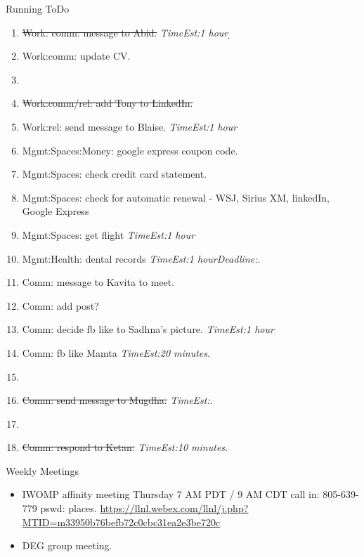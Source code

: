 \documentclass[serif, mathserif, final]{beamer}
\newcommand{\doneTask}[1]{\tiny \item \tiny \sout{#1}}
\newcommand{\te}[1]{\textit{TimeEst:}\textit{#1}}
\newcommand{\dl}[1]{\textit{Deadline:}\textit{#1}}
\begin{document}
\begin{frame}
\begin{columns}
\begin{column}{0.5\linewidth}
  \begin{block}{Running ToDo} %
    \begin{enumerate} 
    \doneTask{Work: comm: message to Abid.} \te{1 hour} \d{} \p{}  
  \item \tiny Work:comm: update CV.
  \item \tiny \doneTask{Work:comm/rel: add Tony to LinkedIn.} 
  \item \tiny Work:rel: send message to Blaise. \te{1 hour} 
\item \tiny Mgmt:Spaces:Money: google express coupon code. 
\item \tiny Mgmt:Spaces: check credit card statement. 
\item \tiny Mgmt:Spaces: check for automatic renewal  - WSJ,  Sirius XM, linkedIn, Google Express 
\item \tiny Mgmt:Spaces: get flight \te{1 hour}
\item \tiny Mgmt:Health: dental records \te{1 hour}\dl{}. 
\item \tiny Comm: message to Kavita to meet. 
\item \tiny Comm: add post? 
\item \tiny Comm: decide fb like to Sadhna's picture. \te{1 hour}  
\item \tiny Comm: fb like Mamta \te{20 minutes}. 
\item \tiny \doneTask{Comm: send message to Mugdha.} \te{}. 
\item \tiny \doneTask{Comm: respond to Ketan.} \te{10 minutes}. 
    \end{enumerate}
  \end{block} 
  

  \begin{block}{Weekly Meetings}
    \begin{itemize} 
    \item \tiny IWOMP affinity meeting Thursday 7 AM PDT / 9 AM
      CDT call in: 805-639-779 pswd: places. 
      \url{https://llnl.webex.com/llnl/j.php?MTID=m33950b76befb72c0cbc31ea2e3be720c}  
    \item \tiny DEG group meeting.  
    \end{itemize}
  \end{block} 
      

\end{column}
\end{columns}
\end{frame}
\end{document}
